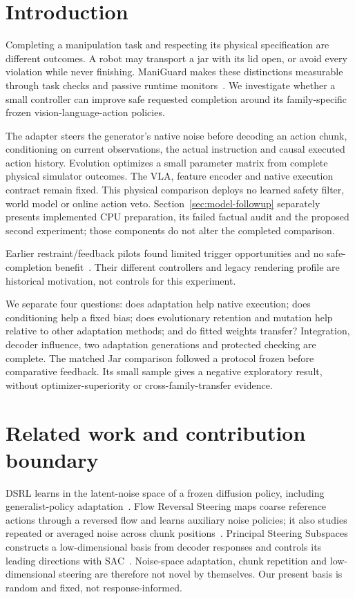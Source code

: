\documentclass[sigconf,dvipsnames,balance=false]{acmart}
\begin{document}
\section{Introduction}
Completing a manipulation task and respecting its physical specification are
different outcomes. A robot may transport a jar with its lid open, or avoid every
violation while never finishing. ManiGuard makes these distinctions measurable
through task checks and passive runtime monitors~\cite{maniguard}. We investigate
whether a small controller can improve safe requested completion around its
family-specific frozen vision-language-action policies.

The adapter steers the generator's native noise before decoding an action chunk,
conditioning on current observations, the actual instruction and causal executed
action history. Evolution optimizes a small parameter matrix from complete
physical simulator outcomes. The VLA, feature encoder and native execution contract
remain fixed. This physical comparison deploys no learned safety filter, world
model or online action veto. Section~\ref{sec:model-followup} separately presents
implemented CPU preparation, its failed factual audit and the proposed second
experiment; those components do not alter the completed comparison.

Earlier restraint/feedback pilots found limited trigger opportunities and no
safe-completion benefit~\cite{priorpilot}. Their different controllers and legacy
rendering profile are historical motivation, not controls for this experiment.

We separate four questions: does adaptation help native execution; does
conditioning help a fixed bias; does evolutionary retention and mutation help
relative to other adaptation methods; and do fitted weights transfer? Integration,
decoder influence, two adaptation generations and protected checking are complete.
The matched Jar comparison followed a protocol frozen before comparative feedback.
Its small sample gives a negative exploratory result, without optimizer-superiority
or cross-family-transfer evidence.

\section{Related work and contribution boundary}
DSRL learns in the latent-noise space of a frozen diffusion policy, including
generalist-policy adaptation~\cite{dsrl}. Flow Reversal Steering maps coarse
reference actions through a reversed flow and learns auxiliary noise policies;
it also studies repeated or averaged noise across chunk positions~\cite{frs}.
Principal Steering Subspaces constructs a low-dimensional basis from decoder
responses and controls its leading directions with SAC~\cite{pss}. Noise-space
adaptation, chunk repetition and low-dimensional steering are therefore not novel
by themselves. Our present basis is random and fixed, not response-informed.
\end{document}
